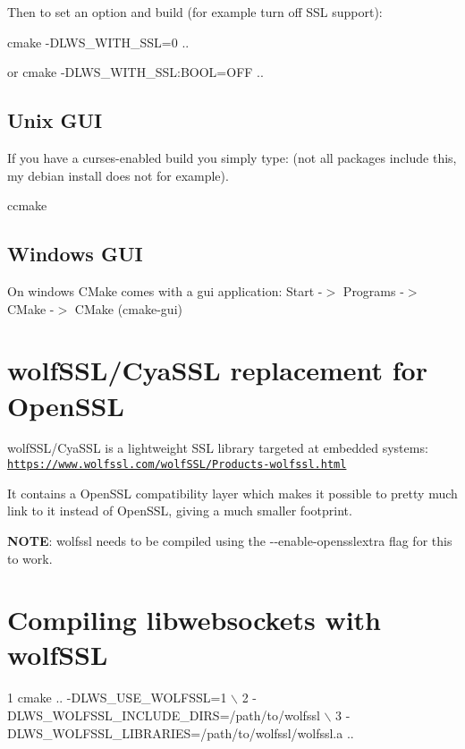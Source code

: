 Then to set an option and build (for example turn off S\+SL support)\+: \begin{DoxyVerb}    cmake -DLWS_WITH_SSL=0 ..
\end{DoxyVerb}
 or cmake -\/\+D\+L\+W\+S\+\_\+\+W\+I\+T\+H\+\_\+\+S\+SL\+:B\+O\+OL=O\+FF ..\hypertarget{md_README.build_cmcoug}{}\subsection{Unix G\+UI}\label{md_README.build_cmcoug}
If you have a curses-\/enabled build you simply type\+: (not all packages include this, my debian install does not for example). \begin{DoxyVerb}    ccmake
\end{DoxyVerb}
\hypertarget{md_README.build_cmcowg}{}\subsection{Windows G\+UI}\label{md_README.build_cmcowg}
On windows C\+Make comes with a gui application\+: Start -\/$>$ Programs -\/$>$ C\+Make -\/$>$ C\+Make (cmake-\/gui)\hypertarget{md_README.build_wolf}{}\section{wolf\+S\+S\+L/\+Cya\+S\+S\+L replacement for Open\+S\+SL}\label{md_README.build_wolf}
wolf\+S\+S\+L/\+Cya\+S\+SL is a lightweight S\+SL library targeted at embedded systems\+: \href{https://www.wolfssl.com/wolfSSL/Products-wolfssl.html}{\tt https\+://www.\+wolfssl.\+com/wolf\+S\+S\+L/\+Products-\/wolfssl.\+html}

It contains a Open\+S\+SL compatibility layer which makes it possible to pretty much link to it instead of Open\+S\+SL, giving a much smaller footprint.

{\bfseries N\+O\+TE}\+: wolfssl needs to be compiled using the {\ttfamily -\/-\/enable-\/opensslextra} flag for this to work.\hypertarget{md_README.build_wolf1}{}\section{Compiling libwebsockets with wolf\+S\+SL}\label{md_README.build_wolf1}

\begin{DoxyCode}
1 cmake .. -DLWS\_USE\_WOLFSSL=1 \(\backslash\)
2          -DLWS\_WOLFSSL\_INCLUDE\_DIRS=/path/to/wolfssl \(\backslash\)
3          -DLWS\_WOLFSSL\_LIBRARIES=/path/to/wolfssl/wolfssl.a ..
\end{DoxyCode}


